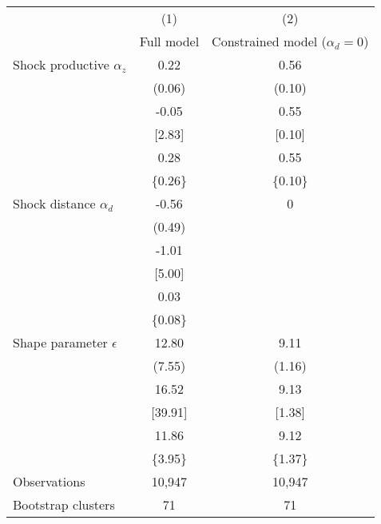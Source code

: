 \begin{tabular}{lcc}
\toprule
 & (1) & (2) \\
 & Full model & Constrained model ($\alpha_d=0$) \\ 
\addlinespace\addlinespace 
Shock productive $\alpha_z$ &  0.22  &  0.56  \\ 
                             & (0.06) & (0.10) \\ 
                             &  -0.05  &  0.55  \\ 
                             & [2.83] & [0.10] \\ 
                             &  0.28  &  0.55  \\ 
                             & \{0.26\} & \{0.10\} \\ 
\addlinespace 
Shock distance   $\alpha_d$ &  -0.56  & 0 \\ 
                             & (0.49) &   \\ 
                             &  -1.01  &   \\ 
                             & [5.00] &   \\ 
                             &  0.03  &   \\ 
                             & \{0.08\} &   \\ 
\addlinespace 
Shape parameter $\epsilon$ &  12.80  &  9.11   \\ 
                             & (7.55) & (1.16) \\ 
                             &  16.52  &  9.13  \\ 
                             & [39.91] & [1.38] \\ 
                             &  11.86  &  9.12  \\ 
                             & \{3.95\} & \{1.37\} \\ 
\addlinespace 
Observations &  10,947  &  10,947  \\ 
Bootstrap clusters &  71  &  71  \\ 
\bottomrule
\end{tabular}
